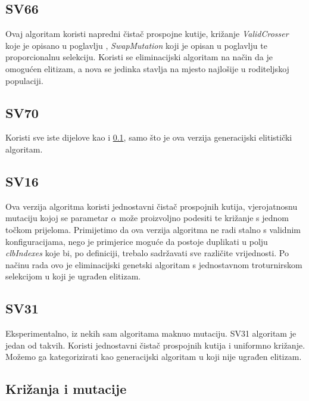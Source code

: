 \documentclass[times, utf8, zavrsni]{fer}
\begin{document}
	
	\subsection{SV66}
	\label{SV66}
	
	Ovaj algoritam koristi napredni čistač prospojne kutije, križanje \emph{ValidCrosser} koje je opisano u poglavlju \label{ValidCrosser}, \emph{SwapMutation} koji je opisan u poglavlju \label{EndMutation} te proporcionalnu selekciju. Koristi se eliminacijski algoritam na način da je omogućen elitizam, a nova se jedinka stavlja na mjesto najlošije u roditeljskoj populaciji. 
	
	\subsection{SV70}
	\label{SV70}
	
	Koristi sve iste dijelove kao i \ref{SV66}, samo što je ova verzija generacijski elitistički algoritam.
	
	\subsection{SV16}
	\label{SV16}
	
	Ova verzija algoritma koristi jednostavni čistač prospojnih kutija, vjerojatnosnu mutaciju kojoj se parametar $\alpha$ može proizvoljno podesiti te križanje s jednom točkom prijeloma. Primijetimo da ova verzija algoritma ne radi stalno s validnim konfiguracijama, nego je primjerice moguće da postoje duplikati u polju \emph{clbIndexes} koje bi, po definiciji, trebalo sadržavati sve različite vrijednosti. Po načinu rada ovo je eliminacijski genetski algoritam s jednostavnom troturnirskom selekcijom u koji je ugrađen elitizam.  
	
	\subsection{SV31}
	
	Eksperimentalno, iz nekih sam algoritama maknuo mutaciju. SV31 algoritam je jedan od takvih. Koristi jednostavni čistač prospojnih kutija i uniformno križanje.
	Možemo ga kategorizirati kao generacijski algoritam u koji nije ugrađen elitizam. 
	
	
	
	\subsection{Križanja i mutacije}
	
\end{document}
